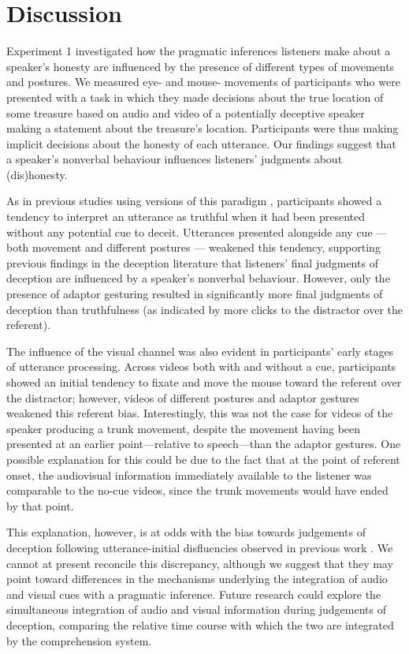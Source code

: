 \documentclass[a4paper,man,natbib]{apa6}
\begin{document}
\section{Discussion}
Experiment 1 investigated how the pragmatic inferences listeners make about a speaker's honesty are influenced by the presence of different types of movements and postures. 
We measured eye- and mouse- movements of participants who were presented with a task in which they made decisions about the true location of some treasure based on audio and video of a potentially deceptive speaker making a statement about the treasure's location.
Participants were thus making implicit decisions about the honesty of each utterance.
Our findings suggest that a speaker's nonverbal behaviour influences listeners' judgments about (dis)honesty.

As in previous studies using versions of this paradigm \citep{Loy2017, King2018}, participants showed a tendency to interpret an utterance as truthful when it had been presented without any potential cue to deceit.
Utterances presented alongside any cue --- both movement and different postures --- weakened this tendency, supporting previous findings in the deception literature that listeners' final judgments of deception are influenced by a speaker's nonverbal behaviour.
However, only the presence of adaptor gesturing resulted in significantly more final judgments of deception than truthfulness (as indicated by more clicks to the distractor over the referent).

The influence of the visual channel was also evident in participants' early stages of utterance processing. 
Across videos both with and without a cue, participants showed an initial tendency to fixate and move the mouse toward the referent over the distractor; however, videos of different postures and adaptor gestures weakened this referent bias.
Interestingly, this was not the case for videos of the speaker producing a trunk movement, despite the movement having been presented at an earlier point---relative to speech---than the adaptor gestures.
One possible explanation for this could be due to the fact that at the point of referent onset, the audiovisual information immediately available to the listener was comparable to the no-cue videos, since the trunk movements would have ended by that point.

This explanation, however, is at odds with the bias towards judgements of deception following utterance-initial disfluencies observed in previous work \citetext{\citet{Loy2017}, Experiment 1}.
We cannot at present reconcile this discrepancy, although we suggest that they may point toward differences in the mechanisms underlying the integration of audio and visual cues with a pragmatic inference.
Future research could explore the simultaneous integration of audio and visual information during judgements of deception, comparing the relative time course with which the two are integrated by the comprehension system.
\end{document}
